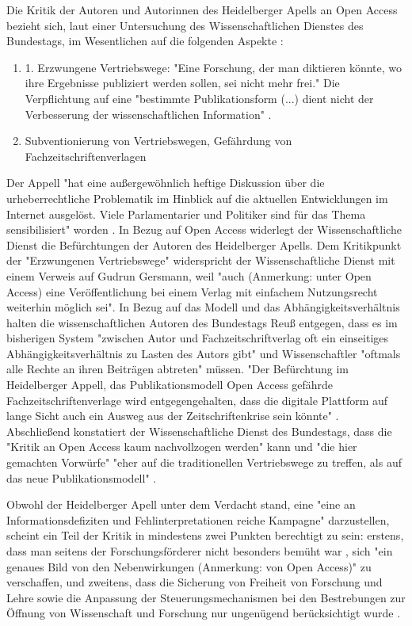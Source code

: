 Die Kritik der Autoren und Autorinnen des Heidelberger Apells an Open Access bezieht sich, laut einer Untersuchung des Wissenschaftlichen Dienstes des Bundestags, im Wesentlichen auf die folgenden Aspekte \cite{Cloes_2009}:
\begin{enumerate}
\item 1.	Erzwungene Vertriebswege: "Eine Forschung, der man diktieren könnte, wo ihre Ergebnisse publiziert werden sollen, sei nicht mehr frei." Die Verpflichtung auf eine "bestimmte Publikationsform (...) dient nicht der Verbesserung der wissenschaftlichen Information" \cite{ITK_2009}.
\item Subventionierung von Vertriebswegen, Gefährdung von Fachzeitschriftenverlagen \cite{ITK_2009}
\end{enumerate}

Der Appell "hat eine außergewöhnlich heftige Diskussion über die urheberrechtliche Problematik im Hinblick auf die aktuellen Entwicklungen im Internet ausgelöst. Viele Parlamentarier und Politiker sind für das Thema sensibilisiert" worden \cite{Cloes_2009}. In Bezug auf Open Access widerlegt der Wissenschaftliche Dienst die Befürchtungen der Autoren des Heidelberger Apells. Dem Kritikpunkt der "Erzwungenen Vertriebswege" widerspricht der Wissenschaftliche Dienst mit einem Verweis auf Gudrun Gersmann, weil "auch (Anmerkung: unter Open Access) eine Veröffentlichung bei einem Verlag mit einfachem Nutzungsrecht weiterhin möglich sei". In Bezug auf das Modell und das Abhängigkeitsverhältnis halten die wissenschaftlichen Autoren des Bundestags Reuß entgegen, dass es im bisherigen System "zwischen Autor und Fachzeitschriftverlag oft ein einseitiges Abhängigkeitsverhältnis zu Lasten des Autors gibt" und Wissenschaftler "oftmals alle Rechte an ihren Beiträgen abtreten" \cite{Cloes_2009} müssen. "Der Befürchtung im Heidelberger Appell, das Publikationsmodell Open Access gefährde Fachzeitschriftenverlage wird entgegengehalten, dass die digitale Plattform auf lange Sicht auch ein Ausweg aus der Zeitschriftenkrise sein könnte" \cite{Cloes_2009}. Abschließend konstatiert der Wissenschaftliche Dienst des Bundestags, dass die "Kritik an Open Access kaum nachvollzogen werden" kann und "die hier gemachten Vorwürfe" "eher auf die traditionellen Vertriebswege zu treffen, als auf das neue Publikationsmodell" \cite{Cloes_2009}.

Obwohl der Heidelberger Apell unter dem Verdacht stand, eine "eine an Informationsdefiziten und Fehlinterpretationen reiche Kampagne" \cite{Schmidt_2009} darzustellen, scheint ein Teil der Kritik in mindestens zwei Punkten berechtigt zu sein: erstens, dass man seitens der Forschungsförderer nicht besonders bemüht war \cite{Heidelberger_Appell_2009}, sich "ein genaues Bild von den Nebenwirkungen (Anmerkung: von Open Access)" \cite{Reuss_2009} zu verschaffen, und zweitens, dass die Sicherung von Freiheit von Forschung und Lehre sowie die Anpassung der Steuerungsmechanismen bei den Bestrebungen zur Öffnung von Wissenschaft und Forschung nur ungenügend berücksichtigt wurde \cite{Hagner_2015}.

